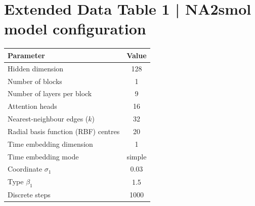 \section*{Extended Data Table 1 | NA2smol model configuration}

\begin{center}
\footnotesize
\setlength{\tabcolsep}{6pt}
\begin{tabular}{@{}lc@{}}
\toprule
\textbf{Parameter} & \textbf{Value} \\
\midrule
Hidden dimension & 128 \\
Number of blocks & 1 \\
Number of layers per block & 9 \\
Attention heads & 16 \\
Nearest-neighbour edges ($k$) & 32 \\
Radial basis function (RBF) centres & 20 \\
Time embedding dimension & 1 \\
Time embedding mode & simple \\
Coordinate \(\sigma_1\) & 0.03 \\
Type \(\beta_1\) & 1.5 \\
Discrete steps & 1000 \\
\bottomrule
\end{tabular}
\end{center}
